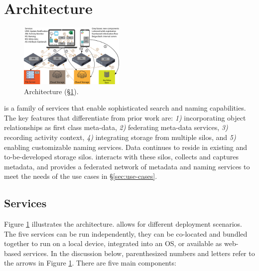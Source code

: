 \section{Architecture}
\label{sec:arch}

\begin{figure}[!tb]
    \centering
    \includegraphics[width=0.45\textwidth]{figures/Naming5-legend.png}
    \caption{\system Architecture (\S \ref{sec:arch}).
    }
    \label{fig:arch}
\end{figure}


\system is a family of services that enable sophisticated search and naming capabilities.
The key features that differentiate \system from prior work are: 
\textit{1)} incorporating object relationships as first class meta-data,
\textit{2)} federating meta-data services,
\textit{3)} recording activity context,
\textit{4)} integrating storage from multiple silos, and
\textit{5)} enabling customizable naming services.
Data continues to reside in existing and to-be-developed storage silos.
\system interacts with these silos, collects and captures metadata, and 
provides a federated network of metadata and naming services to
meet the needs of the use cases in \S \ref{sec:use-cases}.


\subsection{\system Services}

Figure \ref{fig:arch} illustrates the \system architecture. \system allows for different deployment scenarios. The five services can be run independently, they can be co-located and bundled together to run on a local device, integrated into an OS, or available as web-based services.
In the discussion below, parenthesized numbers and letters refer to the arrows in Figure \ref{fig:arch}.
There are five main components:

